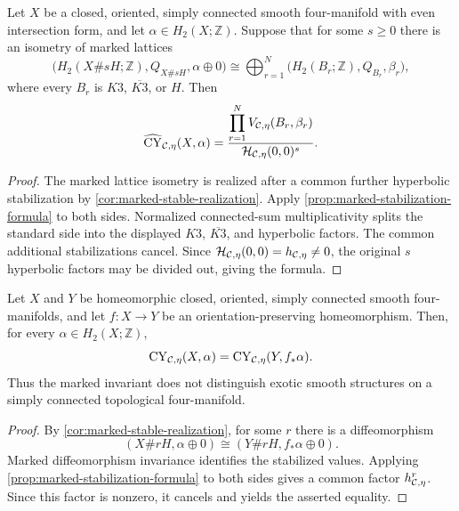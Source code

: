 \begin{proposition}
\label{prop:even-formula}
Let $X$ be a closed, oriented, simply connected smooth four-manifold with
even intersection form, and let $\alpha\in H_2(X;\mathbb Z)$.  Suppose that
for some $s\geq0$ there is an isometry of marked lattices
\[
  \bigl(H_2(X\#sH;\mathbb Z),Q_{X\#sH},\alpha\oplus0\bigr)
  \cong
  \bigoplus_{r=1}^{N}
    \bigl(H_2(B_r;\mathbb Z),Q_{B_r},\beta_r\bigr),
\]
where every $B_r$ is $K3$, $\overline{K3}$, or $H$.  Then
\[
  \widehat{\operatorname{CY}}_{\mathcal{C},\eta}(X,\alpha)
  =\frac{\displaystyle\prod_{r=1}^{N}
      V_{\mathcal{C},\eta}(B_r,\beta_r)}
    {\mathcal H_{\mathcal{C},\eta}(0,0)^s}.
\]
\end{proposition}

\begin{proof}
The marked lattice isometry is realized after a common further hyperbolic
stabilization by \cref{cor:marked-stable-realization}.  Apply
\cref{prop:marked-stabilization-formula} to both sides.  Normalized
connected-sum multiplicativity splits the standard side into the displayed
$K3$, $\overline{K3}$, and hyperbolic factors.  The common additional
stabilizations cancel.  Since
$\mathcal H_{\mathcal{C},\eta}(0,0)=h_{\mathcal{C},\eta}\neq0$, the original $s$
hyperbolic factors may be divided out, giving the formula.
\end{proof}

\begin{corollary}
\label{cor:no-simply-connected-exotic-detection}
Let $X$ and $Y$ be homeomorphic closed, oriented, simply connected smooth
four-manifolds, and let $f\colon X\to Y$ be an orientation-preserving
homeomorphism.  Then, for every $\alpha\in H_2(X;\mathbb Z)$,
\[
  \operatorname{CY}_{\mathcal{C},\eta}(X,\alpha)
  =\operatorname{CY}_{\mathcal{C},\eta}(Y,f_*\alpha).
\]
Thus the marked invariant does not distinguish exotic smooth structures on
a simply connected topological four-manifold.
\end{corollary}

\begin{proof}
By \cref{cor:marked-stable-realization}, for some $r$ there is a
diffeomorphism
\[
  (X\#rH,\alpha\oplus0)
  \cong(Y\#rH,f_*\alpha\oplus0).
\]
Marked diffeomorphism invariance identifies the stabilized values.  Applying
\cref{prop:marked-stabilization-formula} to both sides gives a common factor
$h_{\mathcal{C},\eta}^{r}$.  Since this factor is nonzero, it cancels and yields
the asserted equality.
\end{proof}
